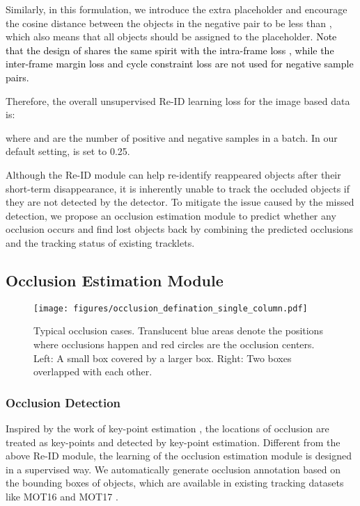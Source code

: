 \documentclass[final,1p,times,twocolumn]{elsarticle}
\newcommand{\qiankun}[1]{\textcolor{black}{#1}}
\begin{document}
	Similarly, in this formulation, we introduce the extra placeholder  and encourage the cosine distance between the objects in the negative pair to be less than , which also means that all objects should be assigned to the placeholder. 
	\qiankun{Note that the design of  shares the same spirit with the intra-frame loss , while the inter-frame margin loss  and cycle constraint  loss  are not used for negative sample pairs.} 
	
	Therefore, the overall unsupervised Re-ID learning loss for the image based data is:
	
	where  and  are the number of positive and negative samples in a batch. In our default setting,  is set to 0.25.
	
	
	
	Although the Re-ID module can help re-identify reappeared objects after their short-term disappearance, it is inherently unable to track the occluded objects if they are not detected by the detector. To mitigate the issue caused by the missed detection, we propose an occlusion estimation module to predict whether any occlusion occurs and find lost objects back by combining the predicted occlusions and the tracking status of existing tracklets.
	
	
	
	\subsection{Occlusion Estimation Module}
	\label{section_occlusion_estimation_module}
	
	\begin{figure}[t]
		\centering
		\texttt{[image: figures/occlusion\_defination\_single\_column.pdf]}
		\caption{Typical occlusion cases. Translucent blue areas denote the positions where occlusions happen and red circles are the occlusion centers. Left: A small box covered by a larger box. Right: Two boxes overlapped with each other.}
		\label{figure_occlusion_defination}
	\end{figure}
	
	
	\subsubsection{Occlusion Detection}
	\label{section_occlusion_detection}
	Inspired by the work of key-point estimation \cite{law2018cornernet, zhou2019objects}, the locations of occlusion are treated as key-points and detected by key-point estimation. 
	Different from the above Re-ID module, the learning of the occlusion estimation module is designed in a supervised way. We automatically generate occlusion annotation based on the bounding boxes of objects, which are available in existing tracking datasets like MOT16 and MOT17 \cite{milan2016mot16}.
	
\end{document}

